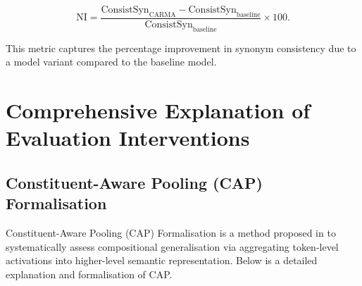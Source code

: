 \begin{equation}
    \text{NI} = \frac{\text{ConsistSyn}_{\text{CARMA}} - \text{ConsistSyn}_{\text{baseline}}}{\text{ConsistSyn}_{\text{baseline}}} \times 100.
\end{equation}

\noindent This metric captures the percentage improvement in synonym consistency due to a model variant compared to the baseline model.


\section{Comprehensive Explanation of Evaluation Interventions}
\subsection{Constituent-Aware Pooling (CAP) Formalisation}\label{sec:cap_explanation}
Constituent-Aware Pooling (CAP) Formalisation is a method proposed in \cite{aljaafari2024interpreting} to systematically assess compositional generalisation via aggregating token-level activations into higher-level semantic representation. Below is a detailed explanation and formalisation of CAP. 
